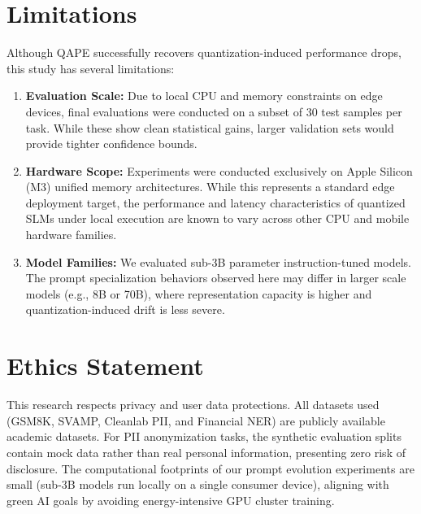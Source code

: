 \documentclass[11pt]{article}
\begin{document}
\section*{Limitations}
Although QAPE successfully recovers quantization-induced performance drops, this study has several limitations:
\begin{enumerate}
    \item \textbf{Evaluation Scale:} Due to local CPU and memory constraints on edge devices, final evaluations were conducted on a subset of 30 test samples per task. While these show clean statistical gains, larger validation sets would provide tighter confidence bounds.
    \item \textbf{Hardware Scope:} Experiments were conducted exclusively on Apple Silicon (M3) unified memory architectures. While this represents a standard edge deployment target, the performance and latency characteristics of quantized SLMs under local execution are known to vary across other CPU and mobile hardware families.
    \item \textbf{Model Families:} We evaluated sub-3B parameter instruction-tuned models. The prompt specialization behaviors observed here may differ in larger scale models (e.g., 8B or 70B), where representation capacity is higher and quantization-induced drift is less severe.
\end{enumerate}

\section*{Ethics Statement}
This research respects privacy and user data protections. All datasets used (GSM8K, SVAMP, Cleanlab PII, and Financial NER) are publicly available academic datasets. For PII anonymization tasks, the synthetic evaluation splits contain mock data rather than real personal information, presenting zero risk of disclosure. The computational footprints of our prompt evolution experiments are small (sub-3B models run locally on a single consumer device), aligning with green AI goals by avoiding energy-intensive GPU cluster training.



\end{document}
